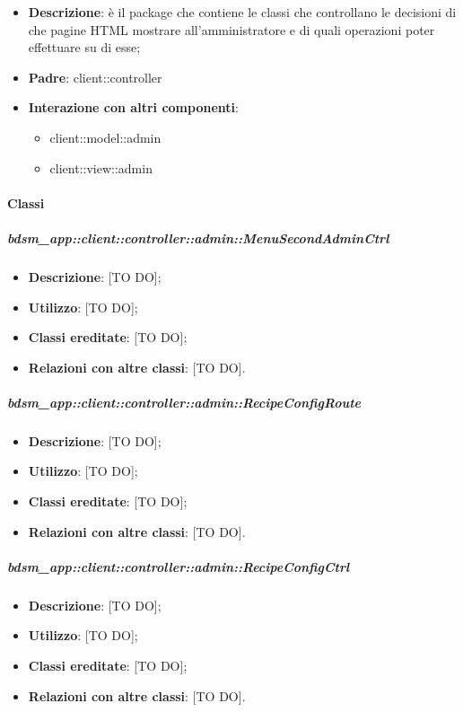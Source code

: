 \begin{itemize}
	\item \textbf{Descrizione}: è il package che contiene le classi che controllano le decisioni di che pagine HTML mostrare all'amministratore e di quali operazioni poter effettuare su di esse;
	\item \textbf{Padre}: client::controller
	\item \textbf{Interazione con altri componenti}:
		\begin{itemize}
			\item client::model::admin
			\item client::view::admin
		\end{itemize}
\end{itemize}

	\paragraph{Classi} %
		\subparagraph{bdsm\_app::client::controller::admin::MenuSecondAdminCtrl} %
		\label{subp:bdsm_app_client_controller_admin_menusecondadminctrl}
			\begin{itemize}
				\item \textbf{Descrizione}: [TO DO];
				\item \textbf{Utilizzo}: [TO DO];
				\item \textbf{Classi ereditate}: [TO DO];
				\item \textbf{Relazioni con altre classi}: [TO DO].
			\end{itemize}

		\subparagraph{bdsm\_app::client::controller::admin::RecipeConfigRoute} %
		\label{subp:bdsm_app_client_controller_admin_recipeconfigroute}
			\begin{itemize}
				\item \textbf{Descrizione}: [TO DO];
				\item \textbf{Utilizzo}: [TO DO];
				\item \textbf{Classi ereditate}: [TO DO];
				\item \textbf{Relazioni con altre classi}: [TO DO].
			\end{itemize}

		\subparagraph{bdsm\_app::client::controller::admin::RecipeConfigCtrl} %
		\label{subp:bdsm_app_client_controller_admin_recipeconfigctrl}
			\begin{itemize}
				\item \textbf{Descrizione}: [TO DO];
				\item \textbf{Utilizzo}: [TO DO];
				\item \textbf{Classi ereditate}: [TO DO];
				\item \textbf{Relazioni con altre classi}: [TO DO].
			\end{itemize}


